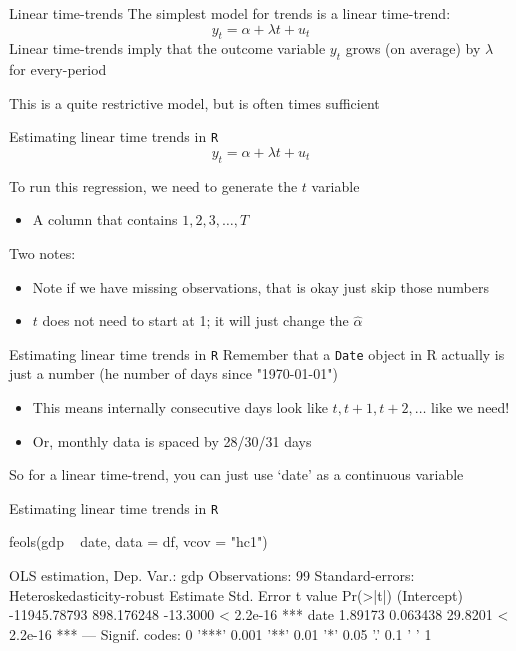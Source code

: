 \documentclass[aspectratio=169,t,11pt,table]{beamer}
\begin{document}
\begin{frame}{Linear time-trends}
  The simplest model for trends is a \alert{linear time-trend}:
  $$
    y_t = \alpha + \lambda t + u_t
  $$
  Linear time-trends imply that the outcome variable $y_t$ grows (on average) by $\lambda$ for every-period

  \bigskip
  This is a quite restrictive model, but is often times sufficient
\end{frame}


\begin{frame}[fragile]{Estimating linear time trends in \texttt{R}}
  \vspace*{-\bigskipamount}
  $$
    y_t = \alpha + \lambda t + u_t
  $$

  To run this regression, we need to generate the $t$ variable
  \begin{itemize}
    \item A column that contains $1, 2, 3, \dots, T$
  \end{itemize}

  \bigskip
  Two notes:
  \begin{itemize}
    \item Note if we have missing observations, that is okay just skip those numbers 
    \item $t$ does not need to start at 1; it will just change the $\hat{\alpha}$
  \end{itemize}
\end{frame}

\begin{frame}[fragile]{Estimating linear time trends in \texttt{R}}
  Remember that a \texttt{Date} object in R actually is just a number (he number of days since "1970-01-01")
  \begin{itemize}
    \item This means internally consecutive days look like $t, t+1, t+2, \dots$ like we need! 
    \item Or, monthly data is spaced by 28/30/31 days
  \end{itemize}

  \bigskip
  So for a linear time-trend, you can just use `date' as a continuous variable
\end{frame}

\begin{frame}[fragile]{Estimating linear time trends in \texttt{R}}

  \begin{codeblock}
feols(gdp ~ date, data = df, vcov = "hc1")
  \end{codeblock}

  \medskip
  \begin{codeblock}[{}]
OLS estimation, Dep. Var.: gdp
Observations: 99
Standard-errors: Heteroskedasticity-robust 
                Estimate Std. Error  t value  Pr(>|t|)    
(Intercept) -11945.78793 898.176248 -13.3000 < 2.2e-16 ***
date             1.89173   0.063438  29.8201 < 2.2e-16 ***
---
Signif. codes:  0 '***' 0.001 '**' 0.01 '*' 0.05 '.' 0.1 ' ' 1
  \end{codeblock}
\end{frame}
\end{document}
